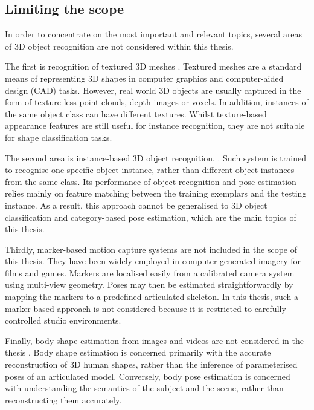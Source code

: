 \subsection{Limiting the scope}

In order to concentrate on the most important and relevant topics, several areas of 3D object recognition are not considered within this thesis. 

The first is recognition of textured 3D meshes \cite{Zaharescu2009, Bronstein2011, Kokkinos2012}. Textured meshes are a standard means of representing 3D shapes in computer graphics and computer-aided design (CAD) tasks. 
However, real world 3D objects are usually captured in the form of texture-less point clouds, depth images or voxels. 
In addition, instances of the same object class can have different textures. Whilst texture-based appearance features are still useful for instance recognition, they are not suitable for shape classification tasks.  

The second area is instance-based 3D object recognition, \eg \cite{Mian2006, Rothganger2006, Shang2010}. Such system is trained to recognise one specific object instance, rather than different object instances from the same class. Its performance of object recognition and pose estimation relies mainly on feature matching between the training exemplars and the testing instance. As a result, this approach cannot be generalised to 3D object classification and category-based pose estimation, which are the main topics of this thesis.    
   

Thirdly, marker-based motion capture systems are not included in the scope of this thesis. They have been widely employed in computer-generated imagery for films and games. Markers are localised easily from a calibrated camera system using multi-view geometry. Poses may then be estimated straightforwardly by mapping the markers to a predefined articulated skeleton. In this thesis, such a marker-based approach is not considered because it is restricted to carefully-controlled studio environments.  
 
Finally, body shape estimation from images and videos are not considered in the thesis \cite{Guan2009, Rother2009, Chen2011}. 
Body shape estimation is concerned primarily with the accurate reconstruction of 3D human shapes, rather than the inference of parameterised poses of an articulated model. Conversely, body pose estimation is concerned with understanding the semantics of the subject and the scene, rather than reconstructing them accurately. 

